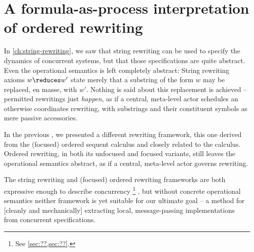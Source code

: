 \chapter{A formula-as-process interpretation of ordered rewriting}\label{ch:formula-as-process}



In \cref{ch:string-rewriting}, we saw that string rewriting can be used to specify the dynamics of concurrent systems, but that those specifications are quite abstract.
Even the operational semantics is left completely abstract:
String rewriting axioms $w \reduces w'$
state merely that a substring of the form $w$ may be replaced, en masse, with $w'$.
Nothing is said about this replacement is achieved -- permitted rewritings just \emph{happen}, as if a central, meta-level actor schedules an otherwise coordinates rewriting, with substrings and their constituent symbols as mere passive accessories.

In the previous , we presented a different rewriting framework, this one derived from the (focused) ordered sequent calculus and closely related to the \citeauthor{Lambek:AMM58} calculus\autocite{Lambek:AMM58}.
Ordered rewriting, in both its unfocused and focused variants, still leaves the operational semantics abstract, as if a central, meta-level actor governs rewriting.

The string rewriting and (focused) ordered rewriting frameworks are both expressive enough to describe concurrency%
\footnote{See \cref{sec:??,sec:??}.}%
, but without concrete operational semantics neither framework is yet suitable for our ultimate goal -- a method for [cleanly and mechanically] extracting local, message-passing implementations from concurrent specifications.



